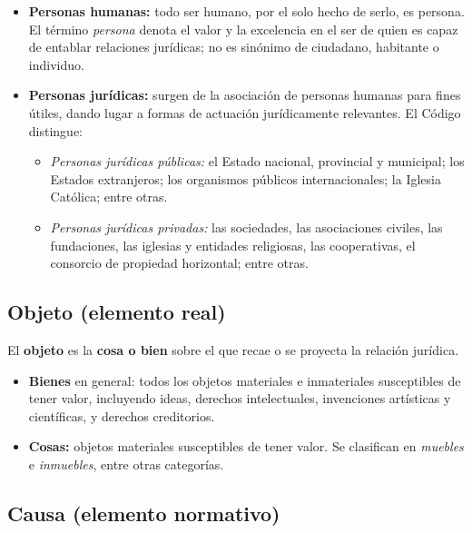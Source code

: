 \documentclass[12pt, a4paper]{report}
\begin{document}
\begin{itemize}
  \item \textbf{Personas humanas:} todo ser humano, por el solo hecho de serlo,
        es persona. El término \textit{persona} denota el valor y la excelencia
        en el ser de quien es capaz de entablar relaciones jurídicas; no es
        sinónimo de ciudadano, habitante o individuo.

  \item \textbf{Personas jurídicas:} surgen de la asociación de personas humanas
        para fines útiles, dando lugar a formas de actuación jurídicamente
        relevantes. El Código distingue:
        \begin{itemize}
          \item \textit{Personas jurídicas públicas:} el Estado nacional,
                provincial y municipal; los Estados extranjeros; los organismos
                públicos internacionales; la Iglesia Católica; entre otras.
          \item \textit{Personas jurídicas privadas:} las sociedades, las
                asociaciones civiles, las fundaciones, las iglesias y entidades
                religiosas, las cooperativas, el consorcio de propiedad
                horizontal; entre otras.
        \end{itemize}
\end{itemize}

\subsection{Objeto (elemento real)}

El \textbf{objeto} es la \textbf{cosa o bien} sobre el que recae o se proyecta
la relación jurídica.

\begin{itemize}
  \item \textbf{Bienes} en general: todos los objetos materiales e inmateriales
        susceptibles de tener valor, incluyendo ideas, derechos intelectuales,
        invenciones artísticas y científicas, y derechos creditorios.
  \item \textbf{Cosas:} objetos materiales susceptibles de tener valor.
        Se clasifican en \textit{muebles} e \textit{inmuebles}, entre otras
        categorías.
\end{itemize}

\subsection{Causa (elemento normativo)}
\end{document}
